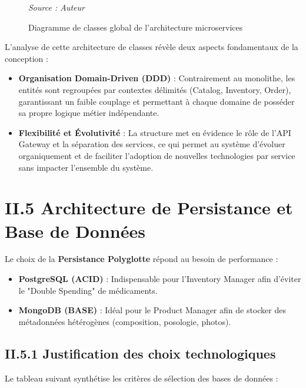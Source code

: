 \begin{figure}[H]
    \centering
    
    \caption{Diagramme de classes global de l'architecture microservices}
    \vspace{0.2cm}\small\textit{Source : Auteur}
    \label{fig:class_architecture}
\end{figure}

L'analyse de cette architecture de classes révèle deux aspects fondamentaux de la conception :
\begin{itemize}
    \item \textbf{Organisation Domain-Driven (DDD)} : Contrairement au monolithe, les entités sont regroupées par contextes délimités (Catalog, Inventory, Order), garantissant un faible couplage et permettant à chaque domaine de posséder sa propre logique métier indépendante.
    \item \textbf{Flexibilité et Évolutivité} : La structure met en évidence le rôle de l'API Gateway et la séparation des services, ce qui permet au système d'évoluer organiquement et de faciliter l'adoption de nouvelles technologies par service sans impacter l'ensemble du système.
\end{itemize}


\section{II.5 Architecture de Persistance et Base de Données}
\label{sec:persistance}

Le choix de la \textbf{Persistance Polyglotte} répond au besoin de performance :
\begin{itemize}
    \item \textbf{PostgreSQL (ACID)} : Indispensable pour l'Inventory Manager afin d'éviter le "Double Spending" de médicaments.
    \item \textbf{MongoDB (BASE)} : Idéal pour le Product Manager afin de stocker des métadonnées hétérogènes (composition, posologie, photos).
\end{itemize}


\subsection{II.5.1 Justification des choix technologiques}

Le tableau suivant synthétise les critères de sélection des bases de données :


